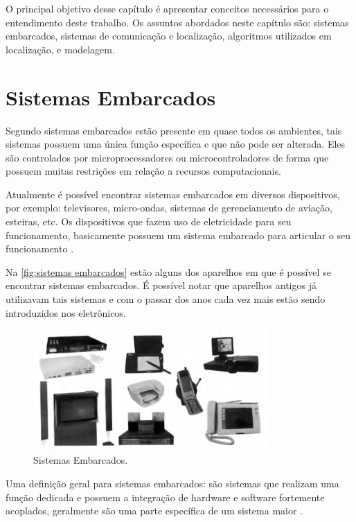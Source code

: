 \label{chapter:conceitos}
O principal objetivo desse capítulo é apresentar conceitos necessários para o entendimento deste trabalho.
Os assuntos abordados neste capítulo são:  
sistemas embarcados, sistemas de comunicação e localização, algoritmos utilizados em localização, e modelagem.

\section{Sistemas Embarcados}

Segundo  sistemas embarcados estão presente em quase todos os ambientes, tais sistemas possuem uma única função específica e que não pode ser alterada. Eles são controlados por microprocessadores ou microcontroladores de forma que possuem muitas restrições em relação a recursos computacionais.

    \par
    Atualmente é possível encontrar sistemas embarcados em diversos dispositivos, por exemplo: televisores, micro-ondas, sistemas de gerenciamento de aviação, esteiras, etc. Os dispositivos que fazem uso de eletricidade para seu funcionamento, basicamente possuem um sistema embarcado para articular o seu funcionamento \cite{rodrigo2016}.
    
    \par
    Na \autoref{fig:sistemas embarcados} estão alguns dos aparelhos em que é possível se encontrar sistemas embarcados. É possível notar que aparelhos antigos já utilizavam tais sistemas e com o passar dos anos cada vez mais estão sendo introduzidos nos eletrônicos.
    \begin{figure}[h!]
              \caption{\label{fig:sistemas embarcados}{Sistemas Embarcados.}}
              \centering
              \includegraphics[width=0.8\textwidth]{Figuras/systems_embedded.PNG}
            \end{figure}
    \par
    Uma definição geral para sistemas embarcados: são sistemas que realizam uma função dedicada e possuem a integração
    de hardware e software fortemente acoplados, geralmente são uma parte específica de um sistema maior \cite{Li:2003:RCE:829584}.
    
